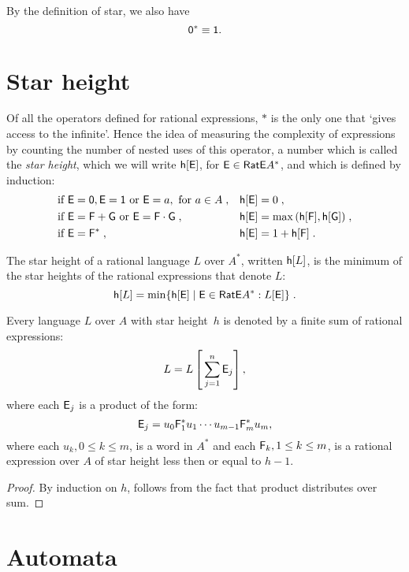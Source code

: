 By the definition of star, we also have
\[
    {\mathsf{0}}^* \equiv {\mathsf{1}}.
\]

\section{Star height}

Of all the operators defined for rational expressions, $*$ is the only one that `gives access to the infinite'. Hence the idea of measuring the complexity of expressions by counting the number of nested uses of this operator, a number which is called the \emph{star height}, which we will write ${\mathsf{h}[{\mathsf{E}}]}$, for ${\mathsf{E}} \in {\mathsf{RatE}} A^*$, and which is defined by induction:
\begin{align*}
    &\text{if } {\mathsf{E}} = {\mathsf{0}}, {\mathsf{E}} = {\mathsf{1}} \text{ or } {\mathsf{E}} = a, \text{ for } a \in A \; , & &{\mathsf{h}[{\mathsf{E}}]} = 0 \; , \\
    &\text{if } {\mathsf{E}} = {\mathsf{F}} + {\mathsf{G}} \text{ or } {\mathsf{E}} = {\mathsf{F}} \cdot {\mathsf{G}}\; , & &{\mathsf{h}[{\mathsf{E}}]} = \max{({\mathsf{h}[{\mathsf{F}}]}, {\mathsf{h}[{\mathsf{G}}]})} \; , \\
    &\text{if } {\mathsf{E}} = {\mathsf{F}}^* \; , & &{\mathsf{h}[{\mathsf{E}}]} = 1 + {\mathsf{h}[{\mathsf{F}}]} \; .
\end{align*}

The star height of a rational language $L$ over $A^*$, written ${\mathsf{h}[L]}$, is the minimum of the star heights of the rational expressions that denote $L$:
\[
    {\mathsf{h}[L]} = \min \{ {\mathsf{h}[{\mathsf{E}}]} \mid {\mathsf{E}} \in {\mathsf{RatE}} A^*: L[{\mathsf{E}}] \} \; .
\]

\begin{lemma}\label{lm:star_height_distributivity}
    Every language $L$ over $A$ with star height~$h$ is denoted by a finite sum of rational expressions:
    \[
        L = L \left[ \, \sum_{j=1}^n {\mathsf{E}}_j \right] ,
    \]
    where each ${\mathsf{E}}_j$ is a product of the form:
    \[
        {\mathsf{E}}_j = u_0{\mathsf{F}}_1^*u_1 \dotsm u_{m-1}{\mathsf{F}}_m^*u_m,
    \]
    where each $u_k, 0 \leq k \leq m$, is a word in $A^*$ and each ${\mathsf{F}}_k, 1 \leq k \leq m$, is a rational expression over $A$ of star height less then or equal to $h-1$.
\end{lemma}

\begin{proof}
    By induction on $h$, follows from the fact that product distributes over sum.
\end{proof}

\section{Automata}


